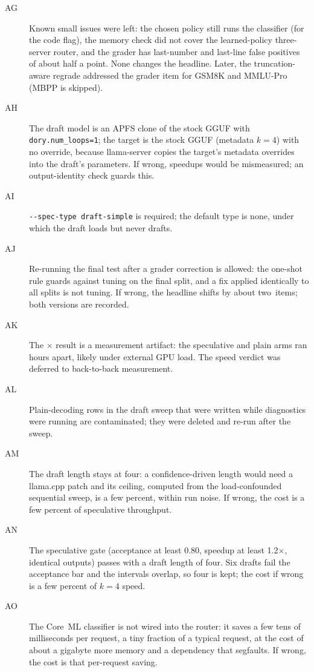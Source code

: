 \documentclass[11pt]{article}
\newcommand{\AJItems}{about two}%
\newcommand{\GateAcc}{0.80}
\newcommand{\GateSpeed}{1.2}
\begin{document}
\begin{description}
\item[AG] Known small issues were left: the chosen policy still runs the classifier (for the code flag), the memory check did not cover the learned-policy three-server router, and the grader has last-number and last-line false positives of about half a point. None changes the headline. Later, the truncation-aware regrade addressed the grader item for GSM8K and MMLU-Pro (MBPP is skipped).
\item[AH] The draft model is an APFS clone of the stock GGUF with \texttt{dory.num\_loops=1}; the target is the stock GGUF (metadata $k{=}4$) with no override, because llama-server copies the target's metadata overrides into the draft's parameters. If wrong, speedups would be mismeasured; an output-identity check guards this.
\item[AI] \texttt{-{}-spec-type draft-simple} is required; the default type is none, under which the draft loads but never drafts.
\item[AJ] Re-running the final test after a grader correction is allowed: the one-shot rule guards against tuning on the final split, and a fix applied identically to all splits is not tuning. If wrong, the headline shifts by \AJItems\ items; both versions are recorded.
\item[AK] The \SpecSequentialRatio$\times$ result is a measurement artifact: the speculative and plain arms ran hours apart, likely under external GPU load. The speed verdict was deferred to back-to-back measurement.
\item[AL] Plain-decoding rows in the draft sweep that were written while diagnostics were running are contaminated; they were deleted and re-run after the sweep.
\item[AM] The draft length stays at four: a confidence-driven length would need a llama.cpp patch and its ceiling, computed from the load-confounded sequential sweep, is a few percent, within run noise. If wrong, the cost is a few percent of speculative throughput.
\item[AN] The speculative gate (acceptance at least \GateAcc, speedup at least \GateSpeed$\times$, identical outputs) passes with a draft length of four. Six drafts fail the acceptance bar and the intervals overlap, so four is kept; the cost if wrong is a few percent of $k{=}4$ speed.
\item[AO] The Core~ML classifier is not wired into the router: it saves a few tens of milliseconds per request, a tiny fraction of a typical request, at the cost of about a gigabyte more memory and a dependency that segfaults. If wrong, the cost is that per-request saving.
\end{description}
\end{document}
